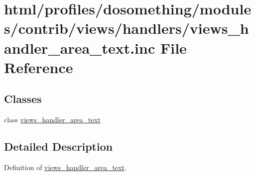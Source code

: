 \hypertarget{views__handler__area__text_8inc}{
\section{html/profiles/dosomething/modules/contrib/views/handlers/views\_\-handler\_\-area\_\-text.inc File Reference}
\label{views__handler__area__text_8inc}
}
\subsection*{Classes}
\begin{DoxyCompactItemize}
\item 
class \hyperlink{classviews__handler__area__text}{views\_\-handler\_\-area\_\-text}
\end{DoxyCompactItemize}


\subsection{Detailed Description}
Definition of \hyperlink{classviews__handler__area__text}{views\_\-handler\_\-area\_\-text}. 